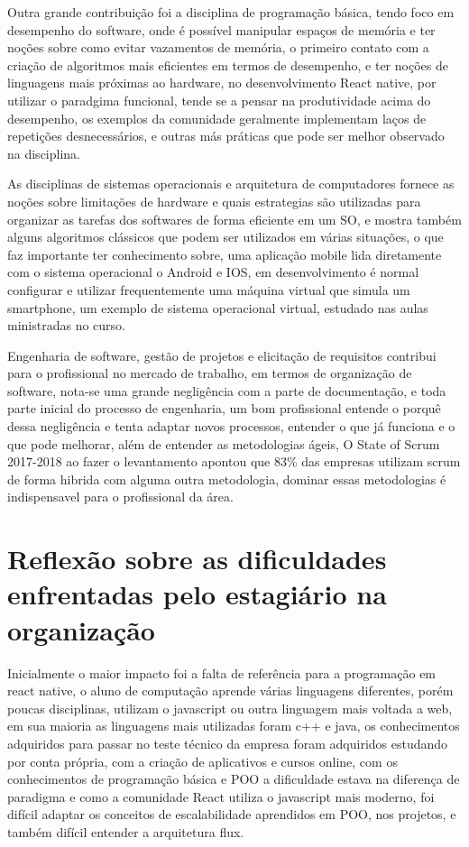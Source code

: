 \documentclass{ufersa}
\begin{document}
Outra grande contribuição foi a disciplina de programação básica, tendo foco em desempenho do software, onde é possível manipular espaços de memória e ter noções sobre como evitar vazamentos de memória, o primeiro contato com a criação de algoritmos mais eficientes em termos de desempenho, e ter noções de linguagens mais próximas ao hardware, no desenvolvimento React native, por utilizar o paradgima funcional, tende se a pensar na produtividade acima do desempenho, os exemplos da comunidade geralmente implementam laços de repetições desnecessários, e outras más práticas que pode ser melhor observado na disciplina.

As disciplinas de sistemas operacionais e arquitetura de computadores fornece as noções sobre limitações de hardware e quais estrategias são utilizadas para organizar as tarefas dos softwares de forma eficiente em um SO, e mostra também alguns algoritmos clássicos que podem ser utilizados em várias situações, o que faz importante ter conhecimento sobre, uma aplicação mobile lida diretamente com o sistema operacional o Android e IOS, em desenvolvimento é normal configurar e utilizar frequentemente uma máquina virtual que simula um smartphone, um exemplo de sistema operacional virtual, estudado nas aulas ministradas no curso.  

Engenharia de software, gestão de projetos e elicitação de requisitos contribui para o profissional no mercado de trabalho, em termos de organização de software, nota-se uma grande negligência com a parte de documentação, e toda parte inicial do processo de engenharia, um bom profissional entende o porquê dessa negligência e tenta adaptar novos processos, entender o que já funciona e o que pode melhorar, além de entender as metodologias ágeis, O State of Scrum 2017-2018 ao fazer o levantamento apontou que 83\% das empresas utilizam scrum de forma hibrida com alguma outra metodologia, dominar essas metodologias é indispensavel para o profissional da área.

\section{Reflexão sobre as dificuldades enfrentadas pelo estagiário na organização}
  Inicialmente o maior impacto foi a falta de referência para a programação em react native,  o aluno de computação aprende várias linguagens diferentes, porém poucas disciplinas, utilizam o javascript ou outra linguagem mais voltada a web, em sua maioria as linguagens mais utilizadas foram c++ e java, os conhecimentos adquiridos para passar no teste técnico da empresa foram adquiridos estudando por conta própria, com a criação de aplicativos e cursos online,  com os conhecimentos de programação básica e POO a dificuldade estava na diferença de paradigma e como a comunidade React utiliza o javascript mais moderno, foi difícil adaptar os conceitos de escalabilidade aprendidos em POO, nos projetos, e também difícil entender a arquitetura flux. 
\end{document}
